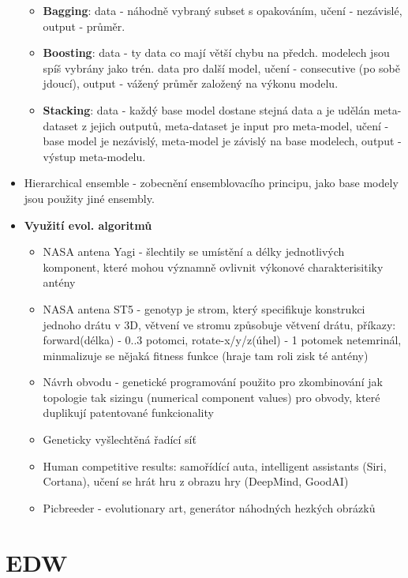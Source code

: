 \documentclass[a4paper,hidelinks]{article}
\begin{document}
\begin{itemize}
\begin{itemize}
            \item \textbf{Bagging}: data - náhodně vybraný subset s opakováním, učení - nezávislé, output - průměr.
            \item \textbf{Boosting}: data - ty data co mají větší chybu na předch. modelech jsou spíš vybrány jako trén. data pro další model, učení - consecutive (po sobě jdoucí), output - vážený průměr založený na výkonu modelu.
            \item \textbf{Stacking}: data - každý base model dostane stejná data a je udělán meta-dataset z jejich outputů, meta-dataset je input pro meta-model, učení - base model je nezávislý, meta-model je závislý na base modelech,  output - výstup meta-modelu.
        \end{itemize}
    \item Hierarchical ensemble - zobecnění ensemblovacího principu, jako base modely jsou použity jiné ensembly.
    \item \textbf{Využití evol. algoritmů}
        \begin{itemize}
            \item NASA antena Yagi - šlechtily se umístění a délky jednotlivých komponent, které mohou významně ovlivnit výkonové charakterisitiky antény
            \item NASA antena ST5 - genotyp je strom, který specifikuje konstrukci jednoho drátu v 3D, větvení ve stromu způsobuje větvení drátu, příkazy: forward(délka) - 0..3 potomci, rotate-x/y/z(úhel) - 1 potomek netemrinál, minmalizuje se nějaká fitness funkce (hraje tam roli zisk té antény)
            \item Návrh obvodu - genetické programování použito pro zkombinování jak topologie tak sizingu (numerical component values) pro obvody, které duplikují patentované funkcionality
            \item Geneticky vyšlechtěná řadící síť
            \item Human competitive results: samořídící auta, intelligent assistants (Siri, Cortana), učení se hrát hru z obrazu hry (DeepMind, GoodAI)
            \item Picbreeder - evolutionary art, generátor náhodných hezkých obrázků
        \end{itemize}
\end{itemize}


\section{EDW}
\end{document}
